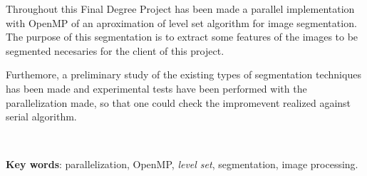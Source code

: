 
\thispagestyle{empty} 

Throughout this Final Degree Project has been made a parallel implementation with OpenMP of an aproximation of level set algorithm for image segmentation. The purpose of this segmentation is to extract some features of the images to be segmented necesaries for the client of this project. 

Furthemore, a preliminary study of the existing types of segmentation techniques has been made and experimental tests have been performed with the parallelization made, so that one could check the impromevent realized against serial algorithm.

\
 
\textbf{Key words}: parallelization, OpenMP, \textit{level set}, segmentation, image processing.

\clearpage                         %
\thispagestyle{empty} \ \clearpage %
